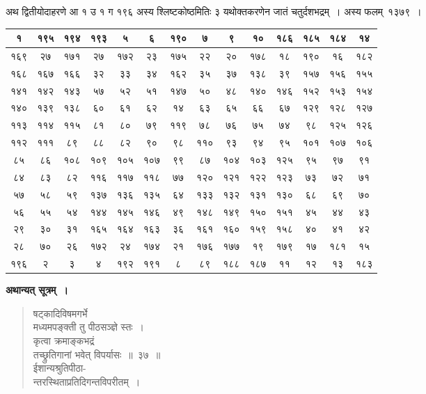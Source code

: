 \documentclass[11pt, openany]{book}
\begin{document}
अथ द्वितीयोदाहरणे आ १ उ १ ग १९६ अस्य श्लिष्टकोष्ठमितिः ३ यथोक्तकरणेन जातं चतुर्दशभद्रम्~। अस्य फलम्~१३७९~।
\begin{table}[h]
	\centering
	\setlength{\extrarowheight}{2pt} \setlength{\tabcolsep}{2pt}
	\begin{tabular}{|c|c|c|c|c|c|c|c|c|c|c|c|c|c|}
		\hline
		१	& १९५ & १९४ & १९३ &५ & ६ & १९० & ७ & ९ & १० & १८६ & १८५ & १८४ & १४\\
		\hline
		१६९ & २७ & १७१ & २७ & १७२ & २३ & १७५ & २२ & २० & १७८ & १८ & १९० & १६ & १८२ \\
		\hline
		१६८ & १६७ & १६६ & ३२ & ३३ & ३४ & १६२ & ३५ & ३७ & १३८ & ३९ & १५७ & १५६ & १५५\\
		\hline
		१४१ & १४२ & १४३ & ५७ & ५२ & ५१ &१४७ & ५० & ४८ & १४० & १४६ & १५२ & १५३ &१५४\\ 
		\hline
		१४० & १३९ & १३८ & ६० & ६१ & ६२ & १४ & ६३ & ६५ & ६६ & ६७ & १२९ & १२८ & १२७ \\
		\hline
		११३ & ११४ & ११५ & ८१ & ८० & ७९ & ११९ & ७८ & ७६ & ७५ & ७४ & ९८ & १२५ & १२६\\
		\hline
		११२ & १११ & ८९ & ८८ & ८२ & ९० & ९८ & ११० & ९३ & ९४ & ९५ & १०१ & १०७ & १०६\\
		\hline
		८५ & ८६ &१०८ & १०९ & १०५& १०७ &  ९९ & ८७ & १०४ & १०३ & १२५ & ९५ & ९७ & ९१  \\
		\hline
		८४ & ८३ & ८२ & ११६ & ११७ & ११८ & ७७ & १२० & १२१ & १२२ & १२३ & ७३ & ७२ & ७१\\
		\hline
		५७ & ५८ & ५९ &  १३७ & १३६ & १३५ & ६४ & १३३ & १३२ & १३१ & १३० & ६८ & ६९& ७०\\
		\hline
		५६ & ५५ & ५४ & १४४ & १४५ & १४६ & ४९ & १४८ & १४९ & १५० & १५१ & ४५ & ४४ & ४३\\
		 \hline
		 २९ & ३० & ३१ & १६५ & १६४ & १६३ & ३६ & १६१ & १६० & १५९ &१५८& ४० &  ४१ & ४२ \\
		 \hline  
		२८ & ७०  & २६ & १७२ & २४ & १७४ & २१ & १७६ & १७७ & १९ & १७९ & १७ & १८१ & १५ \\
		\hline
		१९६ & २ & ३ & ४ & १९२ & १९१ & ८ & ८९ & १८८ & १८७ &११ & १२ & १३ & १८३\\  
		\hline
	\end{tabular}\qquad
\end{table}
\vspace{2mm}

\textbf{अथान्यत् सूत्रम्~।}
\begin{quote}
{\gk षट्कादिविषमगर्भे\\
मध्यमपङ्क्ती तु पीठसञ्ज्ञे स्तः~।\\
कृत्वा क्रमाङ्कभद्रं\\
तच्छ्रुतिगानां भवेत् विपर्यासः~॥~३७~॥\\
ईशान्यश्रुतिपीठा-\\
न्तरस्थिताप्रतिदिगन्तविपरीतम्~।	}
\end{quote}
\end{document}
